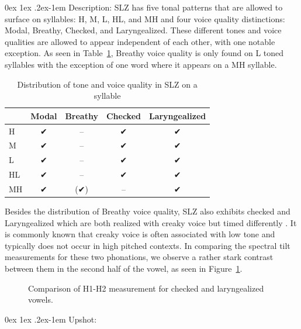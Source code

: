 \documentclass[12pt, letterpaper]{article}
\makeatletter
\renewcommand{\paragraph}{%
  \@startsection{paragraph}{4}%
  {\z@}{0ex \@plus 1ex \@minus .2ex}{-1em}%
  {\normalfont\normalsize\bfseries}%
}
\makeatother
\begin{document}
\paragraph{Description:} 
SLZ has five tonal patterns that are allowed to surface on syllables: H, M, L, HL, and MH and four voice quality distinctions: Modal, Breathy, Checked, and Laryngealized. These different tones and voice qualities are allowed to appear independent of each other, with one notable exception. As seen in Table~\ref{tab:ToneVoiceQuality}, Breathy voice quality is only found on L toned syllables with the exception of one word where it appears on a MH syllable. 
\vspace{-20pt}
\begin{table}[!h]
	\caption{Distribution of tone and voice quality in SLZ on a syllable}
	\label{tab:ToneVoiceQuality}
	\centering

	\begin{tabular}{lcccc}
	\hline

	\hline
		& \textbf{Modal} & \textbf{Breathy} & \textbf{Checked} & \textbf{Laryngealized} \\
	\hline
	H	&	✔ & -- & ✔ & ✔ \\
	M	& ✔ & -- & ✔ & ✔\\
	L	& ✔	& -- & ✔ & ✔\\
	HL	& ✔	& -- & ✔ & ✔\\
	MH	& ✔	& (✔) & -- & ✔ \\
	\hline

	\hline
	\end{tabular}
\end{table}

Besides the distribution of Breathy voice quality, SLZ also exhibits checked and Laryngealized which are both realized with creaky voice but timed differently \citep{silvermanLaryngealComplexityOtomanguean1997}. It is commonly known that creaky voice is often associated with low tone and typically does not occur in high pitched contexts. In comparing the spectral tilt measurements for these two phonations, we observe a rather stark contrast between them in the second half of the vowel, as seen in Figure~\ref{fig:figure1}.
\vspace{-6pt}
\begin{figure}[!h]
	\centering
	\caption{Comparison of H1-H2 measurement for checked and laryngealized vowels.}
	\label{fig:figure1}
\end{figure}
\paragraph{Upshot:} 


\newpage
\thispagestyle{empty}
\printbibliography[heading=bibintoc]
\end{document}
